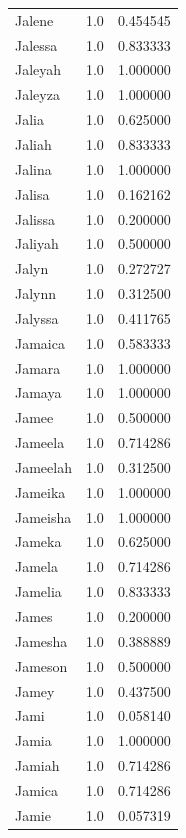 \documentclass[
  letterpaper,
  DIV=11,
  numbers=noendperiod]{scrreprt}
\begin{document}
\begin{tabular}{lrr}
Jalene          &   1.0 &   0.454545 \\
Jalessa         &   1.0 &   0.833333 \\
Jaleyah         &   1.0 &   1.000000 \\
Jaleyza         &   1.0 &   1.000000 \\
Jalia           &   1.0 &   0.625000 \\
Jaliah          &   1.0 &   0.833333 \\
Jalina          &   1.0 &   1.000000 \\
Jalisa          &   1.0 &   0.162162 \\
Jalissa         &   1.0 &   0.200000 \\
Jaliyah         &   1.0 &   0.500000 \\
Jalyn           &   1.0 &   0.272727 \\
Jalynn          &   1.0 &   0.312500 \\
Jalyssa         &   1.0 &   0.411765 \\
Jamaica         &   1.0 &   0.583333 \\
Jamara          &   1.0 &   1.000000 \\
Jamaya          &   1.0 &   1.000000 \\
Jamee           &   1.0 &   0.500000 \\
Jameela         &   1.0 &   0.714286 \\
Jameelah        &   1.0 &   0.312500 \\
Jameika         &   1.0 &   1.000000 \\
Jameisha        &   1.0 &   1.000000 \\
Jameka          &   1.0 &   0.625000 \\
Jamela          &   1.0 &   0.714286 \\
Jamelia         &   1.0 &   0.833333 \\
James           &   1.0 &   0.200000 \\
Jamesha         &   1.0 &   0.388889 \\
Jameson         &   1.0 &   0.500000 \\
Jamey           &   1.0 &   0.437500 \\
Jami            &   1.0 &   0.058140 \\
Jamia           &   1.0 &   1.000000 \\
Jamiah          &   1.0 &   0.714286 \\
Jamica          &   1.0 &   0.714286 \\
Jamie           &   1.0 &   0.057319 \\

\end{tabular}
\end{document}
